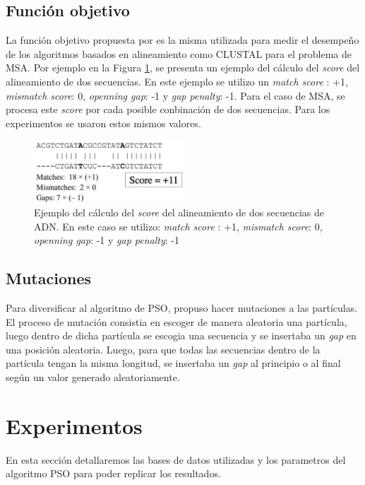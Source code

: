 \documentclass{cup-pan}
\begin{document}
	\subsection{Función objetivo}
	La función objetivo propuesta por \citet{zablocki2009multiple} es la misma utilizada para medir el desempeño de los algoritmos basados en alineamiento como CLUSTAL para el problema de MSA. Por ejemplo en la Figura \ref{fig:fo}, se presenta un ejemplo del cálculo del \textit{score} del alineamiento de dos secuencias. En este ejemplo se utilizo un  \textit{match score} : +1, \textit{mismatch score}: 0, \textit{openning gap}: -1 y \textit{gap penalty}: -1. Para el caso de MSA, se procesa este \textit{score} por cada posible conbinación de dos secuencias. Para los experimentos se usaron estos mismos valores.
	
	\begin{figure}[h]
		\centering
		\includegraphics[width=0.5\textwidth]{images/fo}
		\caption{Ejemplo del cálculo del \textit{score} del alineamiento de dos secuencias de ADN. En este caso se utilizo: \textit{match score} : +1, \textit{mismatch score}: 0, \textit{openning gap}: -1 y \textit{gap penalty}: -1}
		\label{fig:fo}
	\end{figure}
	
	\subsection{Mutaciones}
	Para diversificar al algoritmo de PSO, \citet{zablocki2009multiple} propuso hacer mutaciones a las partículas. El proceso de mutación consistia en escoger de manera aleatoria una partícula, luego dentro de dicha partícula se escogia una secuencia y se insertaba un \textit{gap} en una posición aleatoria. Luego, para que todas las secuencias dentro de la partícula tengan la misma longitud, se insertaba un \textit{gap} al principio o al final según un valor generado aleatoriamente.
	

	\section{Experimentos}
	
	En esta sección detallaremos las bases de datos utilizadas y los parametros del algoritmo PSO para poder replicar los resultados.
	
\end{document}
